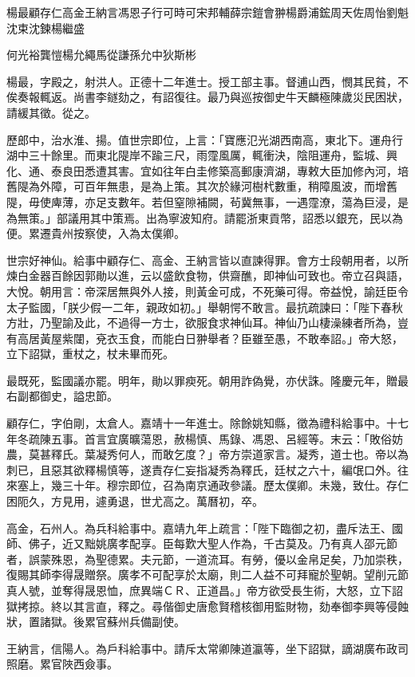 
\begin{pinyinscope}
楊最顧存仁高金王納言馮恩子行可時可宋邦輔薛宗鎧會翀楊爵浦鋐周天佐周怡劉魁沈束沈鍊楊繼盛{{何光裕龔愷楊允繩馬從謙孫允中狄斯彬

楊最，字殿之，射洪人。正德十二年進士。授工部主事。督逋山西，憫其民貧，不俟奏報輒返。尚書李鐩劾之，有詔復往。最乃與巡按御史牛天麟極陳歲災民困狀，請緩其徵。從之。

歷郎中，治水淮、揚。值世宗即位，上言：「寶應氾光湖西南高，東北下。運舟行湖中三十餘里。而東北隄岸不踰三尺，雨霪風厲，輒衝決，陰阻運舟，監城、興化、通、泰良田悉遭其害。宜如往年白圭修築高郵康濟湖，專敕大臣加修內河，培舊隄為外障，可百年無患，是為上策。其次於緣河樹杙數重，稍障風波，而增舊隄，毋使庳薄，亦足支數年。若但窒隙補闕，茍冀無事，一遇霪潦，蕩為巨浸，是為無策。」部議用其中策焉。出為寧波知府。請罷浙東貢幣，詔悉以銀充，民以為便。累遷貴州按察使，入為太僕卿。

世宗好神仙。給事中顧存仁、高金、王納言皆以直諫得罪。會方士段朝用者，以所煉白金器百餘因郭勛以進，云以盛飲食物，供齋醮，即神仙可致也。帝立召與語，大悅。朝用言：帝深居無與外人接，則黃金可成，不死藥可得。帝益悅，諭廷臣令太子監國，「朕少假一二年，親政如初。」舉朝愕不敢言。最抗疏諫曰：「陛下春秋方壯，乃聖諭及此，不過得一方士，欲服食求神仙耳。神仙乃山棲澡練者所為，豈有高居黃屋紫闥，兗衣玉食，而能白日翀舉者？臣雖至愚，不敢奉詔。」帝大怒，立下詔獄，重杖之，杖未畢而死。

最既死，監國議亦罷。明年，勛以罪瘐死。朝用詐偽覺，亦伏誅。隆慶元年，贈最右副都御史，謚忠節。

顧存仁，字伯剛，太倉人。嘉靖十一年進士。除餘姚知縣，徵為禮科給事中。十七年冬疏陳五事。首言宜廣曠蕩恩，赦楊慎、馬錄、馮恩、呂經等。末云：「敗俗妨農，莫甚釋氏。葉凝秀何人，而敢乞度？」帝方崇道家言。凝秀，道士也。帝以為刺已，且惡其欲釋楊慎等，遂責存仁妄指凝秀為釋氏，廷杖之六十，編氓口外。往來塞上，幾三十年。穆宗即位，召為南京通政參議。歷太僕卿。未幾，致仕。存仁困阨久，方見用，遽勇退，世尤高之。萬曆初，卒。

高金，石州人。為兵科給事中。嘉靖九年上疏言：「陛下臨御之初，盡斥法王、國師、佛子，近又黜姚廣孝配享。臣每歎大聖人作為，千古莫及。乃有真人邵元節者，誤蒙殊恩，為聖德累。夫元節，一道流耳。有勞，優以金帛足矣，乃加崇秩，復賜其師李得晟贈祭。廣孝不可配享於太廟，則二人益不可拜寵於聖朝。望削元節真人號，並奪得晟恩恤，庶異端ＣＲ、正道昌。」帝方欲受長生術，大怒，立下詔獄拷掠。終以其言直，釋之。尋偕御史唐愈賢稽核御用監財物，劾奉御李興等侵蝕狀，置諸獄。後累官蘇州兵備副使。

王納言，信陽人。為戶科給事中。請斥太常卿陳道瀛等，坐下詔獄，謫湖廣布政司照磨。累官陜西僉事。

}}
\end{pinyinscope}
